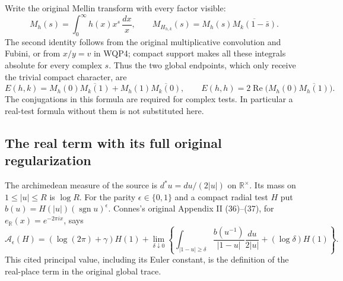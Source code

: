 Write the original Mellin transform with every factor visible:
\begin{equation}\tag{WQP6}
 M_h(s)=\int_0^\infty h(x)x^s\,\frac{dx}{x},\qquad
 M_{H_{h,k}}(s)=M_h(s)\overline{M_k(1-\bar s)}.
\end{equation}
The second identity follows from the original multiplicative convolution
and Fubini, or from $x/y=v$ in WQP4; compact support makes all these
integrals absolute for every complex $s$. Thus the two global endpoints,
which only receive the trivial compact character, are
\begin{equation}\tag{WQP7}
 E(h,k)=M_h(0)\overline{M_k(1)}
             +M_h(1)\overline{M_k(0)},\qquad
 E(h,h)=2\operatorname{Re}\bigl(M_h(0)\overline{M_h(1)}\bigr).
\end{equation}
The conjugations in this formula are required for complex tests. In
particular a real-test formula without them is not substituted here.

\subsection{The real term with its full original regularization}

The archimedean measure of the source is $d^*u=du/(2|u|)$ on
$\mathbb R^\times$. Its mass on $1\le |u|\le R$ is $\log R$.
For the parity $\epsilon\in\{0,1\}$ and a compact radial test $H$ put
$b(u)=H(|u|)(\operatorname{sgn}u)^\epsilon$. Connes's original
Appendix II (36)--(37), for $e_{\mathbb R}(x)=e^{-2\pi ix}$, says
\begin{equation}\tag{WQP8}
 \mathcal A_\epsilon(H)=
 (\log(2\pi)+\gamma)H(1)
 +\lim_{\delta\downarrow0}
 \left\{\int_{|1-u|\ge\delta}
       \frac{b(u^{-1})}{|1-u|}\frac{du}{2|u|}
             +(\log\delta)H(1)\right\}.
\end{equation}
This cited principal value, including its Euler constant, is the
definition of the real-place term in the original global trace.

